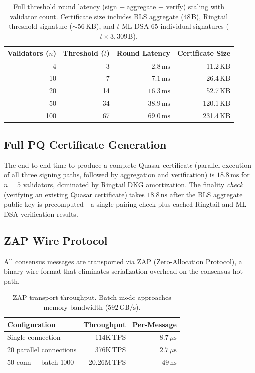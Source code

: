 \documentclass[11pt,a4paper]{article}
\begin{document}
\begin{table}[ht]
\centering
\begin{tabular}{@{}rrrr@{}}
\toprule
\textbf{Validators ($n$)} & \textbf{Threshold ($t$)} &
\textbf{Round Latency} & \textbf{Certificate Size} \\
\midrule
4   & 3   & $2.8\,\text{ms}$  & 11.2\,KB \\
10  & 7   & $7.1\,\text{ms}$  & 26.4\,KB \\
20  & 14  & $16.3\,\text{ms}$ & 52.7\,KB \\
50  & 34  & $38.9\,\text{ms}$ & 120.1\,KB \\
100 & 67  & $69.0\,\text{ms}$ & 231.4\,KB \\
\bottomrule
\end{tabular}
\caption{Full threshold round latency (sign + aggregate + verify) scaling
with validator count. Certificate size includes BLS aggregate (48\,B),
Ringtail threshold signature ($\sim$56\,KB), and $t$ ML-DSA-65 individual
signatures ($t \times 3{,}309$\,B).}
\label{tab:threshold}
\end{table}

\subsection{Full PQ Certificate Generation}

The end-to-end time to produce a complete Quasar certificate (parallel
execution of all three signing paths, followed by aggregation and
verification) is $18.8\,\text{ms}$ for $n = 5$ validators, dominated by
Ringtail DKG amortization. The finality \emph{check} (verifying an existing
Quasar certificate) takes $18.8\,\text{ns}$ after the BLS aggregate public
key is precomputed---a single pairing check plus cached Ringtail and ML-DSA
verification results.

\subsection{ZAP Wire Protocol}

All consensus messages are transported via ZAP (Zero-Allocation Protocol),
a binary wire format that eliminates serialization overhead on the
consensus hot path.

\begin{table}[ht]
\centering
\begin{tabular}{@{}lrr@{}}
\toprule
\textbf{Configuration} & \textbf{Throughput} & \textbf{Per-Message} \\
\midrule
Single connection       & 114K\,TPS   & $8.7\,\mu\text{s}$ \\
20 parallel connections & 376K\,TPS   & $2.7\,\mu\text{s}$ \\
50 conn + batch 1000    & 20.26M\,TPS & $49\,\text{ns}$ \\
\bottomrule
\end{tabular}
\caption{ZAP transport throughput. Batch mode approaches memory bandwidth
($592\,\text{GB/s}$).}
\label{tab:zap}
\end{table}
\end{document}
